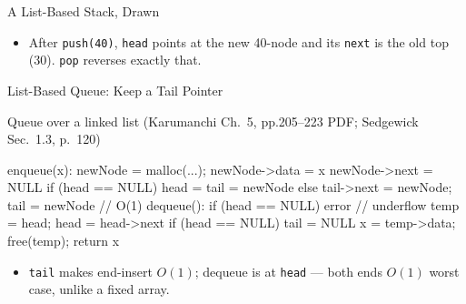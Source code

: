 \documentclass[aspectratio=169]{beamer}
\begin{document}
\begin{frame}{A List-Based Stack, Drawn}
  \begin{center}
  \end{center}
  \vspace{-0.2cm}
  \begin{itemize}
    \item After \texttt{push(40)}, \texttt{head} points at the new 40-node and
      its \texttt{next} is the old top (30). \texttt{pop} reverses exactly
      that.
  \end{itemize}
\end{frame}

\begin{frame}[fragile]{List-Based Queue: Keep a Tail Pointer}
  \begin{block}{Queue over a linked list (Karumanchi Ch.~5, pp.205--223 PDF;
    Sedgewick Sec.~1.3, p.~120)
    \cite{Karumanchi2017_data_structures_algorithms_made_easy,Sedgewick2011_algorithms}}
\begin{semiverbatim}
enqueue(x):
  newNode = malloc(...); newNode->data = x
  newNode->next = NULL
  if (head == NULL) head = tail = newNode
  else tail->next = newNode; tail = newNode    // O(1)
dequeue(): if (head == NULL) error      // underflow
           temp = head; head = head->next
           if (head == NULL) tail = NULL
           x = temp->data; free(temp); return x
\end{semiverbatim}
  \end{block}
  \begin{itemize}
    \item \texttt{tail} makes end-insert $O(1)$; dequeue is at \texttt{head}
      --- both ends $O(1)$ worst case, unlike a fixed array.
  \end{itemize}
\end{frame}
\end{document}
